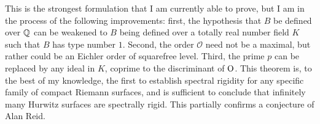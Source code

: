 \documentclass[11pt]{amsart}
\begin{document}
This is the strongest formulation that I am currently able to prove, but I am in the process of the following improvements: first, the hypothesis that $B$ be defined over $\mathbb{Q}$ can be weakened to $B$ being defined over a totally real number field $K$ such that $B$ has type number $1$. Second, the order $\mathcal{O}$ need not be a maximal, but rather could be an Eichler order of squarefree level. Third, the prime $p$ can be replaced by any ideal in $K$, coprime to the discriminant of $\operatorname{O}$. This theorem is, to the best of my knowledge, the first to establish spectral rigidity for any specific family of compact Riemann surfaces, and is sufficient to conclude that infinitely many Hurwitz surfaces are spectrally rigid. This partially confirms a conjecture \cite{reid2014} of Alan Reid. 




\end{document}
